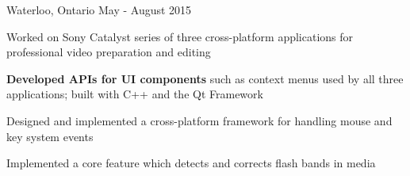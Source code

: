 \begin{cventries}
    {Waterloo, Ontario}
    {May - August 2015}
    {
      \begin{cvitems}
        \item Worked on Sony Catalyst series of three cross-platform applications for professional video preparation and editing
        \item \textbf{Developed APIs for UI components} such as context menus used by all three applications; built with C++ and the Qt Framework
        \item Designed and implemented a cross-platform framework for handling mouse and key system events
        \item Implemented a core feature which detects and corrects flash bands in media
      \end{cvitems}
    }
\end{cventries}


